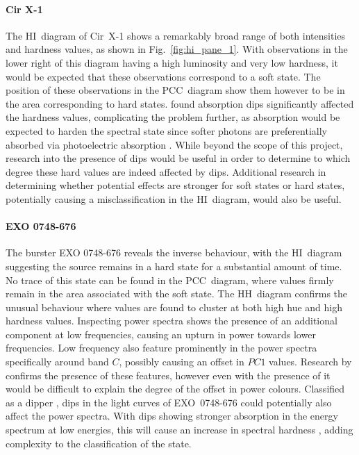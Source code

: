 \paragraph{Cir X-1} The \ac{HI}~diagram of Cir~X-1 shows a remarkably broad range of both intensities and hardness values, as shown in Fig.~\ref{fig:hi_pane_1}. With observations in the lower right of this diagram having a high luminosity and very low hardness, it would be expected that these observations correspond to a soft state. The position of these observations in the \ac{PCC}~diagram show them however to be in the area corresponding to hard states. \citet{fridriksson2015common} found absorption dips significantly affected the hardness values, complicating the problem further, as absorption would be expected to harden the spectral state since softer photons are preferentially absorbed via photoelectric absorption \citep[][]{wilms2000absorption}. While beyond the scope of this project, research into the presence of dips would be useful in order to determine to which degree these hard values are indeed affected by dips. Additional research in determining whether potential effects are stronger for soft states or hard states, potentially causing a misclassification in the \ac{HI}~diagram, would also be useful.

\paragraph{EXO 0748-676} The burster EXO 0748-676 reveals the inverse behaviour, with the \ac{HI}~diagram suggesting the source remains in a hard state for a substantial amount of time. No trace of this state can be found in the \ac{PCC}~diagram, where values firmly remain in the area associated with the soft state. The \ac{HH}~diagram confirms the unusual behaviour where values are found to cluster at both high hue and high hardness values. Inspecting power spectra shows the presence of an additional component at low frequencies, causing an upturn in power towards lower frequencies. Low frequency \QPOs also feature prominently in the power spectra specifically around band $C$, possibly causing an offset in $PC1$ values. Research by \citet{homan2015geometric} confirms the presence of these features, however even with the presence of \QPOs it would be difficult to explain the degree of the offset in power colours. Classified as a dipper \citep{homan2012possible}, dips in the light curves of EXO~0748-676 could potentially also affect the power spectra. With dips showing stronger absorption in the energy spectrum at low energies, this will cause an increase in spectral hardness \citep[][]{wilms2000absorption}, adding complexity to the classification of the state. \\

